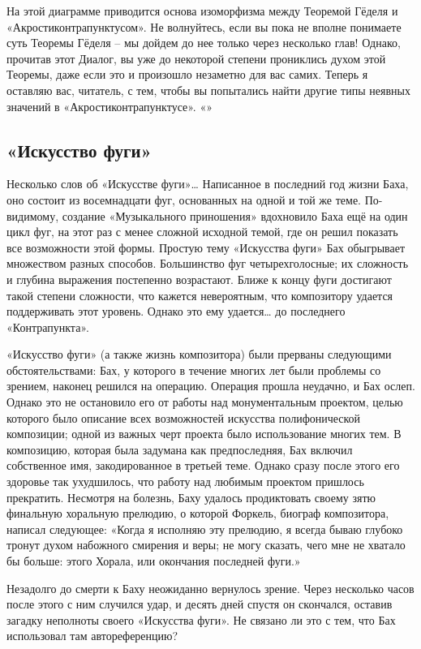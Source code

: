 \documentclass[../main.tex]{subfiles}
\begin{document}
На этой диаграмме приводится основа изоморфизма между Теоремой Гёделя и «Акростиконтрапунктусом». Не волнуйтесь, если вы пока не вполне понимаете суть Теоремы Гёделя \--- мы дойдем до нее только через несколько глав! Однако, прочитав этот Диалог, вы уже до некоторой степени прониклись духом этой Теоремы, даже если это и произошло незаметно для вас самих. Теперь я оставляю вас, читатель, с тем, чтобы вы попытались найти другие типы неявных значений в «Акростиконтрапунктусе». «»


\subsection{«Искусство фуги»}

Несколько слов об «Искусстве фуги»\ldots{} Написанное в последний год жизни Баха, оно состоит из восемнадцати фуг, основанных на одной и той же теме. По-видимому, создание «Музыкального приношения» вдохновило Баха ещё на один цикл фуг, на этот раз с менее сложной исходной темой, где он решил показать все возможности этой формы. Простую тему «Искусства фуги» Бах обыгрывает множеством разных способов. Большинство фуг четырехголосные; их сложность и глубина выражения постепенно возрастают. Ближе к концу фуги достигают такой степени сложности, что кажется невероятным, что композитору удается поддерживать этот уровень. Однако это ему удается\ldots{} до последнего «Контрапункта».

«Искусство фуги» (а также жизнь композитора) были прерваны следующими обстоятельствами: Бах, у которого в течение многих лет были проблемы со зрением, наконец решился на операцию. Операция прошла неудачно, и Бах ослеп. Однако это не остановило его от работы над монументальным проектом, целью которого было описание всех возможностей искусства полифонической композиции; одной из важных черт проекта было использование многих тем. В композицию, которая была задумана как предпоследняя, Бах включил собственное имя, закодированное в третьей теме. Однако сразу после этого его здоровье так ухудшилось, что работу над любимым проектом пришлось прекратить. Несмотря на болезнь, Баху удалось продиктовать своему зятю финальную хоральную прелюдию, о которой Форкель, биограф композитора, написал следующее: «Когда я исполняю эту прелюдию, я всегда бываю глубоко тронут духом набожного смирения и веры; не могу сказать, чего мне не хватало бы больше: этого Хорала, или окончания последней фуги.»

Незадолго до смерти к Баху неожиданно вернулось зрение. Через несколько часов после этого с ним случился удар, и десять дней спустя он скончался, оставив загадку неполноты своего «Искусства фуги». Не связано ли это с тем, что Бах использовал там автореференцию?
\end{document}
